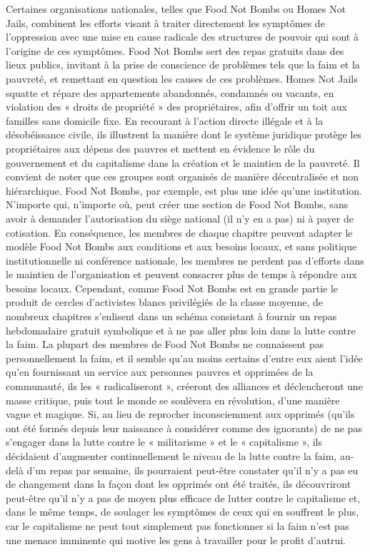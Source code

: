 Certaines organisations nationales, telles que Food Not Bombs ou Homes Not Jails, combinent les efforts visant à traiter directement les symptômes de l'oppression avec une mise en cause radicale des structures de pouvoir qui sont à l'origine de ces symptômes. Food Not Bombs sert des repas gratuits dans des lieux publics, invitant à la prise de conscience de problèmes tels que la faim et la pauvreté, et remettant en question les causes de ces problèmes. Homes Not Jails squatte et répare des appartements abandonnés, condamnés ou vacants, en violation des « droits de propriété » des propriétaires, afin d'offrir un toit aux familles sans domicile fixe. En recourant à l'action directe illégale et à la désobéissance civile, ils illustrent la manière dont le système juridique protège les propriétaires aux dépens des pauvres et mettent en évidence le rôle du gouvernement et du capitalisme dans la création et le maintien de la pauvreté. Il convient de noter que ces groupes sont organisés de manière décentralisée et non hiérarchique. Food Not Bombs, par exemple, est plus une idée qu'une institution. N'importe qui, n'importe où, peut créer une section de Food Not Bombs, sans avoir à demander l'autorisation du siège national (il n'y en a pas) ni à payer de cotisation. En conséquence, les membres de chaque chapitre peuvent adapter le modèle Food Not Bombs aux conditions et aux besoins locaux, et sans politique institutionnelle ni conférence nationale, les membres ne perdent pas d'efforts dans le maintien de l'organisation et peuvent consacrer plus de temps à répondre aux besoins locaux. Cependant, comme Food Not Bombs est en grande partie le produit de cercles d'activistes blancs privilégiés de la classe moyenne, de nombreux chapitres s'enlisent dans un schéma consistant à fournir un repas hebdomadaire gratuit symbolique et à ne pas aller plus loin dans la lutte contre la faim. La plupart des membres de Food Not Bombs ne connaissent pas personnellement la faim, et il semble qu'au moins certains d'entre eux aient l'idée qu'en fournissant un service aux personnes pauvres et opprimées de la communauté, ils les « radicaliseront », créeront des alliances et déclencheront une masse critique, puis tout le monde se soulèvera en révolution, d'une manière vague et magique. Si, au lieu de reprocher inconsciemment aux opprimés (qu'ils ont été formés depuis leur naissance à considérer comme des ignorants) de ne pas s'engager dans la lutte contre le « militarisme » et le « capitalisme », ils décidaient d'augmenter continuellement le niveau de la lutte contre la faim, au-delà d'un repas par semaine, ils pourraient peut-être constater qu'il n'y a pas eu de changement dans la façon dont les opprimés ont été traités, ils découvriront peut-être qu'il n'y a pas de moyen plus efficace de lutter contre le capitalisme et, dans le même temps, de soulager les symptômes de ceux qui en souffrent le plus, car le capitalisme ne peut tout simplement pas fonctionner si la faim n'est pas une menace imminente qui motive les gens à travailler pour le profit d'autrui.

